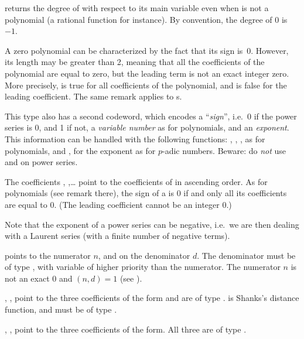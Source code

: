  returns the degree of  with respect to its
main variable even when  is not a polynomial (a rational function for
instance). By convention, the degree of $0$ is~$-1$.

 A zero polynomial can be characterized by the
fact that its sign is~0. However, its length may be greater than 2, meaning
that all the coefficients of the polynomial are equal to zero, but the
leading term  is not an exact integer zero. More precisely,
 is true for all coefficients  of the polynomial,
and  is false for the leading coefficient. The same
remark applies to s.

This type also has a second codeword, which
encodes a ``\emph{sign}'', i.e.~0 if the power series is 0, and 1 if not, a
\emph{variable number} as for polynomials, and an \emph{exponent}. This
information can be handled with the following functions: ,
, ,  as for polynomials, and ,
 for the exponent as for $p$-adic numbers. Beware: do \emph{not}
use  and  on power series.

The coefficients , ,\dots {} point to
the coefficients of  in ascending order. As for polynomials
(see remark there), the sign of a  is $0$ if and only all
its coefficients are equal to $0$. (The leading coefficient cannot be an
integer $0$.)

Note that the exponent of a power series can be negative, i.e.~we are
then dealing with a Laurent series (with a finite number of negative
terms).

%
  points to the
numerator $n$, and  on the denominator $d$. The denominator must be
of type , with variable of higher priority than the numerator. The
numerator $n$ is not an exact $0$ and $(n,d) = 1$ (see ).

%
 ,
,  point to the three coefficients of the form and are of
type .  is Shanks's distance function, and must be of type
.

%
 , ,
 point to the three coefficients of the form. All three are of type
.

